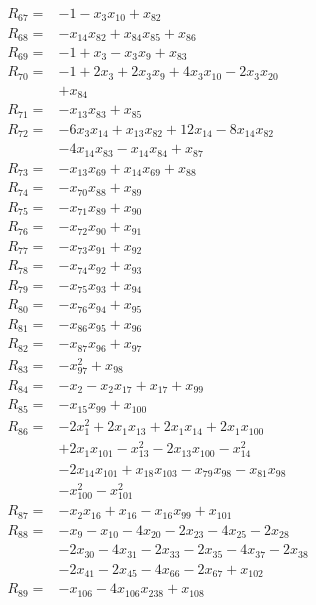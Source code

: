 \begin{align*}
R_{67}={}&-1 -x_{3}x_{10} +x_{82}\\[3pt]
R_{68}={}&-x_{14}x_{82} +x_{84}x_{85} +x_{86}\\[3pt]
R_{69}={}&-1 +x_{3} -x_{3}x_{9} +x_{83}\\[3pt]
R_{70}={}&-1 +2x_{3} +2x_{3}x_{9} +4x_{3}x_{10} -2x_{3}x_{20}\\
&+x_{84}\\[3pt]
R_{71}={}&-x_{13}x_{83} +x_{85}\\[3pt]
R_{72}={}&-6x_{3}x_{14} +x_{13}x_{82} +12x_{14} -8x_{14}x_{82}\\
&-4x_{14}x_{83} -x_{14}x_{84} +x_{87}\\[3pt]
R_{73}={}&-x_{13}x_{69} +x_{14}x_{69} +x_{88}\\[3pt]
R_{74}={}&-x_{70}x_{88} +x_{89}\\[3pt]
R_{75}={}&-x_{71}x_{89} +x_{90}\\[3pt]
R_{76}={}&-x_{72}x_{90} +x_{91}\\[3pt]
R_{77}={}&-x_{73}x_{91} +x_{92}\\[3pt]
R_{78}={}&-x_{74}x_{92} +x_{93}\\[3pt]
R_{79}={}&-x_{75}x_{93} +x_{94}\\[3pt]
R_{80}={}&-x_{76}x_{94} +x_{95}\\[3pt]
R_{81}={}&-x_{86}x_{95} +x_{96}\\[3pt]
R_{82}={}&-x_{87}x_{96} +x_{97}\\[3pt]
R_{83}={}&-x_{97}^{2} +x_{98}\\[3pt]
R_{84}={}&-x_{2} -x_{2}x_{17} +x_{17} +x_{99}\\[3pt]
R_{85}={}&-x_{15}x_{99} +x_{100}\\[3pt]
R_{86}={}&-2x_{1}^{2} +2x_{1}x_{13} +2x_{1}x_{14} +2x_{1}x_{100}\\
&+2x_{1}x_{101} -x_{13}^{2} -2x_{13}x_{100} -x_{14}^{2}\\
&-2x_{14}x_{101} +x_{18}x_{103} -x_{79}x_{98} -x_{81}x_{98}\\
&-x_{100}^{2} -x_{101}^{2}\\[3pt]
R_{87}={}&-x_{2}x_{16} +x_{16} -x_{16}x_{99} +x_{101}\\[3pt]
R_{88}={}&-x_{9} -x_{10} -4x_{20} -2x_{23} -4x_{25} -2x_{28}\\
&-2x_{30} -4x_{31} -2x_{33} -2x_{35} -4x_{37} -2x_{38}\\
&-2x_{41} -2x_{45} -4x_{66} -2x_{67} +x_{102}\\[3pt]
R_{89}={}&-x_{106} -4x_{106}x_{238} +x_{108}\\[3pt]

\end{align*}
